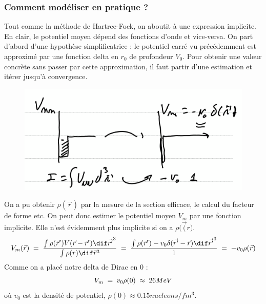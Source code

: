 \subsubsection{Comment modéliser en pratique ?}
Tout comme la méthode de Hartree-Fock, on aboutit à une expression implicite. En clair, le potentiel moyen dépend des fonctions d'onde et vice-versa. On part d'abord d'une hypothèse simplificatrice : le potentiel carré vu précédemment est approximé par une fonction delta en $r_0$ de profondeur $V_0$. Pour obtenir une valeur concrète sans passer par cette approximation, il faut partir d'une estimation et itérer jusqu'à convergence.
\begin{figure}[H]
    \centering
    \includegraphics[scale = 0.8]{Images4/delta_potentiel.PNG}
\end{figure}
On a pu obtenir $\rho(\Vec{r})$ par la mesure de la section efficace, le calcul du facteur de forme etc. On peut donc estimer le potentiel moyen $V_{m}$ par une fonction implicite. Elle n'est évidemment plus implicite si on a $\rho(\vec({r)}$.
\begin{equation*}
    V_m(\vec{r}) \eq \dfrac{\int \rho(\vec{r}')V(\vec{r}-\vec{r}')\dif\vec{r'}^3}{\int \rho(r)\dif\vec{r}^3}\eq \dfrac{\int \rho(\vec{r}')-v_0\delta(\vec{r'}-\vec{r})\dif\vec{r'}^3}{1}\eq -v_0 \rho(\vec{r})
\end{equation*}
Comme on a placé notre delta de Dirac en 0 :
\begin{equation*}
    V_m \; = \; v_0 \rho(0) \; \approx \; 26MeV
\end{equation*}
où $v_0$ est la densité de potentiel, $\rho(0) \approx 0.15nucleons/fm^3$.\\

